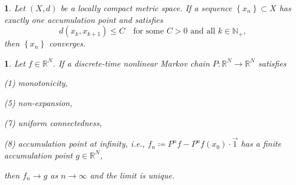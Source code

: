 \documentclass[10pt,a4paper]{amsart}
\newtheorem{thm}{}
\newtheorem{lem}{}
\begin{document}
\begin{lem}
\label{lem: convergence lemma by the uniqueness}Let $(X,d)$ be a
locally compact metric space. If a sequence $\left\{ x_{n}\right\}\subset X$
has exactly one accumulation point and satisfies 
\[
d(x_{k},x_{k+1})\leq C \quad \text{for some }C>0 \text{ and all } k \in\mathbb{N}_{+},
\]
then $\left\{ x_{n}\right\} $
converges. 
\end{lem}

\begin{thm}
\label{thm:NLMC convergence 3}Let $f\in \mathbb{R}^{N}$. If a discrete-time nonlinear Markov
chain $P:\mathbb{R}^{N}\to\mathbb{R}^{N}$ satisfies

(1) monotonicity,

(5) non-expansion,

(7) uniform connectedness,

(8) accumulation point at infinity, i.e., $f_{n}\coloneqq P^{n}f-P^{n}f(x_{0})\cdot \overrightarrow{1}$
has a finite accumulation point $g\in \mathbb{R}^{N}$, 

then $f_{n}\to g$ as $n\to\infty$
and the limit is unique. 
\end{thm}
\end{document}
